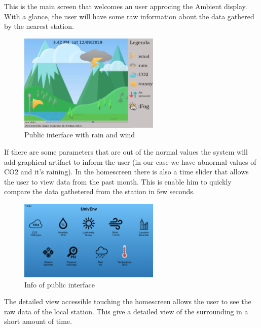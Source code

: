 \documentclass[12pt]{article} %
\begin{document}
\begin{itemize}
This is the main screen that welcomes an user approcing the Ambient display.
With a glance, the user will have some raw information about the data gathered by the nearest station.

\begin{figure}[H]
  \centering
  \includegraphics[width=0.6\textwidth]{img/wind+rain.png}
  \caption{Public interface with rain and wind}
  \label{fig:boat1}
\end{figure}

If there are some parameters that are out of the normal values the system will add graphical artifact to
inform the user (in our case we have abnormal values of CO2 and it's raining).
In the homescreen there is also a time slider that allows the user to view data from the past month. 
This is enable him to quickly compare the data gathetered from the station in few seconds.
 
\begin{figure}[H]
  \centering
  \includegraphics[width=0.6\textwidth]{img/p2.png}
  \caption{Info of public interface}
  \label{fig:boat2}
\end{figure}

The detailed view accessible touching the homescreen allows the user to see the raw data of the local station.
This give a detailed view of the surrounding in a short amount of time.
\end{itemize}
\newpage
\end{document}
